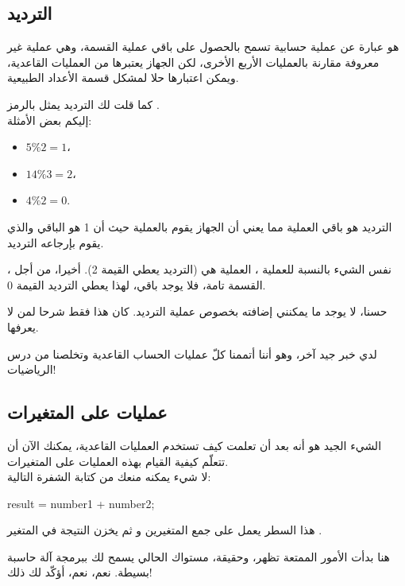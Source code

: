 \subsection{الترديد}

هو عبارة عن عملية حسابية تسمح بالحصول على باقي عملية القسمة، وهي عملية غير معروفة مقارنة بالعمليات الأربع الأخرى، لكن الجهاز يعتبرها من العمليات القاعدية، ويمكن اعتبارها حلا لمشكل قسمة الأعداد الطبيعية.

كما قلت لك الترديد يمثل بالرمز
\InlineCode{\%}.\\
إليكم بعض الأمثلة:

\begin{itemize}
  \item $ 5 \% 2 = 1 $،
  \item $ 14 \% 3 = 2 $،
  \item $ 4 \% 2 = 0 $.
\end{itemize}

الترديد
هو باقي العملية
مما يعني أن الجهاز يقوم بالعملية
حيث أن 1 هو الباقي والذي يقوم بإرجاعه الترديد.

نفس الشيء بالنسبة للعملية
،
العملية هي
(الترديد يعطي القيمة  2). أخيرا، من أجل
،
القسمة تامة، فلا يوجد باقي، لهذا يعطي الترديد القيمة 0.

حسنا، لا يوجد ما يمكنني إضافته بخصوص عملية الترديد. كان هذا فقط شرحا لمن لا يعرفها.

لدي خبر جيد آخر، وهو أننا أتممنا كلّ عمليات الحساب القاعدية وتخلصنا من درس الرياضيات!

\subsection{عمليات على المتغيرات}

الشيء الجيد هو أنه بعد أن تعلمت كيف تستخدم العمليات القاعدية، يمكنك الآن أن تتعلّم كيفية القيام بهذه العمليات على المتغيرات.\\
لا شيء يمكنه منعك من كتابة الشفرة التالية:

\begin{Csource}
  result = number1 + number2;
\end{Csource}

هذا السطر يعمل على جمع المتغيرين
و
ثم يخزن النتيجة في المتغير
.

هنا بدأت الأمور الممتعة تظهر، وحقيقة، مستواك الحالي يسمح لك ببرمجة آلة حاسبة بسيطة. نعم، نعم، أؤكّد لك ذلك!

